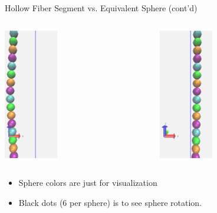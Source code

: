 \documentclass[t,presentation]{beamer}
\begin{document}
\begin{frame}[label={sec:org16e0822}]{Hollow Fiber Segment vs. Equivalent Sphere (cont'd)}
\vspace{0.25cm}
\begin{columns}[c]
\begin{column}{.45\textwidth}
\centering
\includegraphics[height=2.25in]{figures/fig-chain-100-spheres-nearview-t00.png}\par
\end{column}
\begin{column}{.45\textwidth} %
\centering
\includegraphics[height=2.25in]{figures/fig-chain-100-spheres-nearview-t24.png}\par
\end{column}
\end{columns}

\begin{itemize}
\item Sphere colors are just for visualization
\item Black dots (6 per sphere) is to see sphere rotation.
\end{itemize}
\end{frame}
\end{document}
